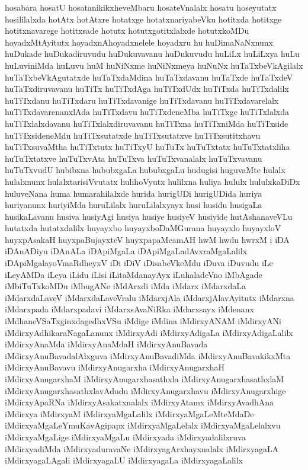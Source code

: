 {hosabara
hosatU
hosatanikikxheveMbaru
hosateVnalalx
hosatu
hoseyutatx
hosililalxda
hotAtx
hotAtxre
hotatxge
hotatxnariyabeVku
hotitxda
hotitxge
hotitxnavarege
hotitxsade
hotutx
hotutxgotitxlalxde
hotutxkoMDu
hoyadxMtAyitutx
hoyadxnAhoyadxnelele
hoyadxru
hu
huDimaNaNxnunx
huDukade
huDukadiruvudu
huDukuvavanu
huDukuvudu
huLiLx
huLiLxya
huLu
huLuviniMda
huLuvu
huM
huNiNxme
huNiNxmeya
huNuNx
huTaTxbeVkAgilalx
huTaTxbeVkAgutatxde
huTaTxdaMdina
huTaTxdavanu
huTaTxde
huTaTxdeV
huTaTxdiruvavanu
huTiTx
huTiTxdAga
huTiTxdUdx
huTiTxda
huTiTxdalilx
huTiTxdanu
huTiTxdaru
huTiTxdavanige
huTiTxdavanu
huTiTxdavarelalx
huTiTxdavarenanxlAda
huTiTxdavu
huTiTxdeneMba
huTiTxge
huTiTxlalxda
huTiTxlalxdavanu
huTiTxlalxdiruvavanu
huTiTxna
huTiTxniMda
huTiTxside
huTiTxsideneMdu
huTiTxsutatxde
huTiTxsutatxve
huTiTxsutitxhavu
huTiTxsuvaMtha
huTiTxtutx
huTiTxyU
huTuTx
huTuTxtatx
huTuTxtatxliha
huTuTxtatxve
huTuTxvAta
huTuTxva
huTuTxvanalalx
huTuTxvavanu
huTuTxvudU
hubibxna
hububxgaLa
hububxgaLu
hudugisi
huguvaMte
hulalx
hulalxnunx
hulalxtarisiVvutatx
hulihoVyutx
hulilxna
huliya
hululx
hululxkaDiDx
huluveNana
huma
humarahilalxde
hurida
hurigUDi
hurigUDida
huriya
huriyanunx
huriyiMda
huruLilalx
huruLilalxyayx
husi
husidu
husigaLa
husikaLavanu
husiva
husiyAgi
husiya
husiye
husiyeV
husiyide
hutAshanaveVLu
hutatxda
hutatxdalilx
huyayxbo
huyayxboDaMGurana
huyayxlo
huyayxloV
huyxpAsakaH
huyxpaBujayxteV
huyxpapaMcamAH
hwM
hwdu
hwrxM
i
iDA
iDAnADiyu
iDAnALa
iDApiMgaLa
iDApiMgaLadAvxraMgaLalilx
iDApiMgalayoVmaRdheyxV
iDi
iDiV
iDisabeVkeMdu
iDuva
iDuvudu
iLe
iLeyAMDa
iLeya
iLidu
iLisi
iLitaMdanayAyx
iLuhaladeVno
iMbAgade
iMbiTuTxkoMDu
iMbugANe
iMdArxdi
iMda
iMdarx
iMdarxdaLa
iMdarxdaLaveV
iMdarxdaLaveVralu
iMdarxjAla
iMdarxjAlavAyitutx
iMdarxna
iMdarxpada
iMdarxpadavi
iMdarxsAvaNiRka
iMdarxsayx
iMdenanx
iMdhaneVSaTxginxdagedhxVSu
iMdige
iMdina
iMdirxyANAM
iMdirxyANi
iMdirxyAdhikaraNagaLanunx
iMdirxyAdi
iMdirxyAdigaLa
iMdirxyAdigaLalilx
iMdirxyAnaMda
iMdirxyAnaMdaH
iMdirxyAnuBavada
iMdirxyAnuBavadalAlxguva
iMdirxyAnuBavadiMda
iMdirxyAnuBavakikxMta
iMdirxyAnuBavavu
iMdirxyAnugarxha
iMdirxyAnugarxhaH
iMdirxyAnugarxhaM
iMdirxyAnugarxhasathxla
iMdirxyAnugarxhasathxlaM
iMdirxyAnugarxhasathxlavAdudu
iMdirxyAnugarxhavu
iMdirxyAnugarxhige
iMdirxyApaRNa
iMdirxyAsakatxnalalx
iMdirxyAtamx
iMdirxyAvadhAna
iMdirxya
iMdirxyaM
iMdirxyaMgaLalilx
iMdirxyaMgaLeMteMdaDe
iMdirxyaMgaLeYmuKavAgipapx
iMdirxyaMgaLelalx
iMdirxyaMgaLelalxvu
iMdirxyaMgaLige
iMdirxyaMgaLu
iMdirxyada
iMdirxyadalilxruva
iMdirxyadiMda
iMdirxyaduravaNe
iMdirxyagArxhayxnalalx
iMdirxyagaLA
iMdirxyagaLAgali
iMdirxyagaLU
iMdirxyagaLa
iMdirxyagaLalilx
}
